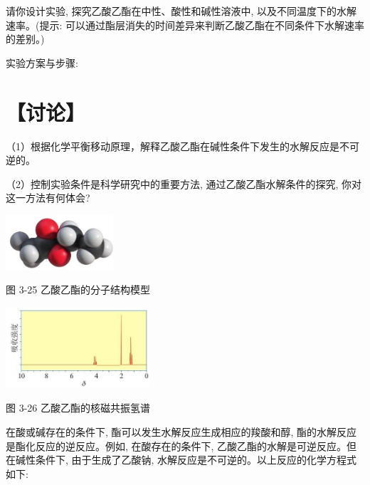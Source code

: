 \documentclass[10pt]{article}
\begin{document}
请你设计实验, 探究乙酸乙酯在中性、酸性和碱性溶液中, 以及不同温度下的水解速率。(提示: 可以通过酯层消失的时间差异来判断乙酸乙酯在不同条件下水解速率的差别。)

实验方案与步骤:

\begin{center}
\end{center}

\section*{【讨论】}

（1）根据化学平衡移动原理，解释乙酸乙酯在碱性条件下发生的水解反应是不可逆的。

（2）控制实验条件是科学研究中的重要方法, 通过乙酸乙酯水解条件的探究, 你对这一方法有何体会?

\begin{center}
\includegraphics[max width=0.3\textwidth]{images/0190efc5-b58a-7c43-bfb0-e0a030df9cfd_83_843657.jpg}
\end{center}

图 3-25 乙酸乙酯的分子结构模型

\begin{center}
\includegraphics[max width=0.4\textwidth]{images/0190efc5-b58a-7c43-bfb0-e0a030df9cfd_83_112278.jpg}
\end{center}

图 3-26 乙酸乙酯的核磁共振氢谱

在酸或碱存在的条件下, 酯可以发生水解反应生成相应的羧酸和醇, 酯的水解反应是酯化反应的逆反应。例如, 在酸存在的条件下, 乙酸乙酯的水解是可逆反应。但在碱性条件下, 由于生成了乙酸钠, 水解反应是不可逆的。以上反应的化学方程式如下:
\end{document}
